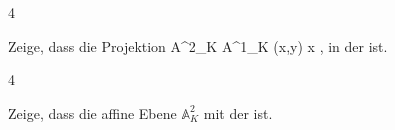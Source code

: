 {4}


{


Zeige, dass die Projektion
\maabbeledisp {} {  {\mathbb A}^{2}_{K} } { {\mathbb A}^{1}_{K}
} {(x,y)} {x
} {,}
in der 
ist.


}


{} {}




{4}


{


Zeige, dass die affine Ebene $\mathbb A^2_K$ mit der
ist.


}


{} {}
